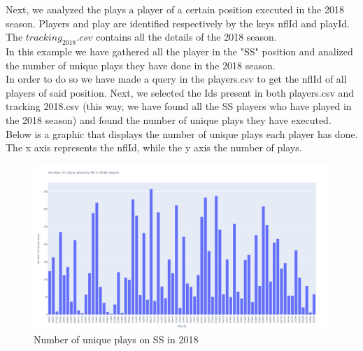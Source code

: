 \documentclass{article}
\begin{document}
Next, we analyzed the plays a player of a certain position executed in the 2018 season.  Players and play are identified respectively by the keys nflId and playId. The $tracking_2018.csv$ contains all the details of the 2018 season.\\
In this example we have gathered all the player in the "SS" position and analized the number of unique plays they have done in the 2018 season.\\ In order to do so we have made a query in the players.csv to get the nflId of all players of said position. Next, we selected the Ids present in both players.csv and tracking 2018.csv (this way, we have found all the SS players who have played in the 2018 season) and found the number of unique plays they have executed. Below is a graphic that displays the number of unique plays each player has done. The x axis represents the nflId, while the y axis the number of plays.
\begin{figure}[H]
	\includegraphics[width=\linewidth,height=\textheight,keepaspectratio]{SS_unique_plays_2018.png}
	\caption{Number of unique plays on SS in 2018}
\end{figure}
\end{document}
